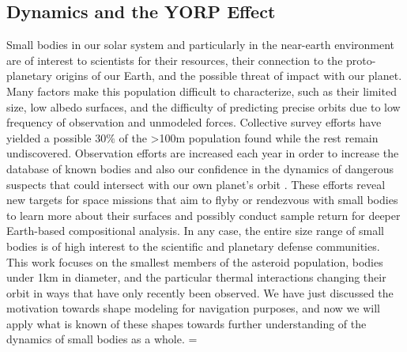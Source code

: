 \subsection{Dynamics and the YORP Effect}
Small bodies in our solar system and particularly in the near-earth environment are of interest to scientists for their resources, their connection to the proto-planetary origins of our Earth, and the possible threat of impact with our planet. Many factors make this population difficult to characterize, such as their limited size, low albedo surfaces, and the difficulty of predicting precise orbits due to low frequency of observation and unmodeled forces. Collective survey efforts have yielded a possible $30\%$ of the >100m population found while the rest remain undiscovered. Observation efforts are increased each year in order to increase the database of known bodies and also our confidence in the dynamics of dangerous suspects that could intersect with our own planet's orbit \cite{Jones2016}\cite{Mainzer2011}. These efforts reveal new targets for space missions that aim to flyby or rendezvous with small bodies to learn more about their surfaces and possibly conduct sample return for deeper Earth-based compositional analysis. In any case, the entire size range of small bodies is of high interest to the scientific and planetary defense communities. This work focuses on the smallest members of the asteroid population, bodies under 1km in diameter, and the particular thermal interactions changing their orbit in ways that have only recently been observed. We have just discussed the motivation towards shape modeling for navigation purposes, and now we will apply what is known of these shapes towards further understanding of the dynamics of small bodies as a whole. =

